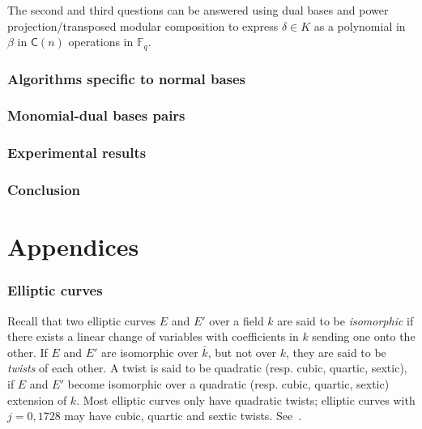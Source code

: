 \documentclass[12pt]{article}
\theoremstyle{plain}
\theoremstyle{definition}
\def\F{\ensuremath{\mathbb{F}}}
\def\MC{\ensuremath{\mathsf{C}}}
\begin{document}
The second and third questions can be answered using
dual bases and power projection/transposed modular composition
to express $\delta \in K$ as a polynomial in $\beta$ in
$\MC(n)$ operations in $\F_q$.



\section{Algorithms specific to normal bases}


\section{Monomial-dual bases pairs}


\section{Experimental results}


\section{Conclusion}


\appendix
\part*{Appendices}


\section{Elliptic curves}
\label{app:elliptic-curves}

Recall that two elliptic curves $E$ and $E'$ over a field $k$ are said
to be \emph{isomorphic} if there exists a linear change of variables
with coefficients in $k$ sending one onto the other. If $E$ and $E'$
are isomorphic over $\bar{k}$, but not over $k$, they are said to be
\emph{twists} of each other. A twist is said to be quadratic
(resp. cubic, quartic, sextic), if $E$ and $E'$ become isomorphic over
a quadratic (resp. cubic, quartic, sextic) extension of $k$. Most
elliptic curves only have quadratic twists; elliptic curves with
$j=0,1728$ may have cubic, quartic and sextic twists. See~\cite{Sil}.
\end{document}
